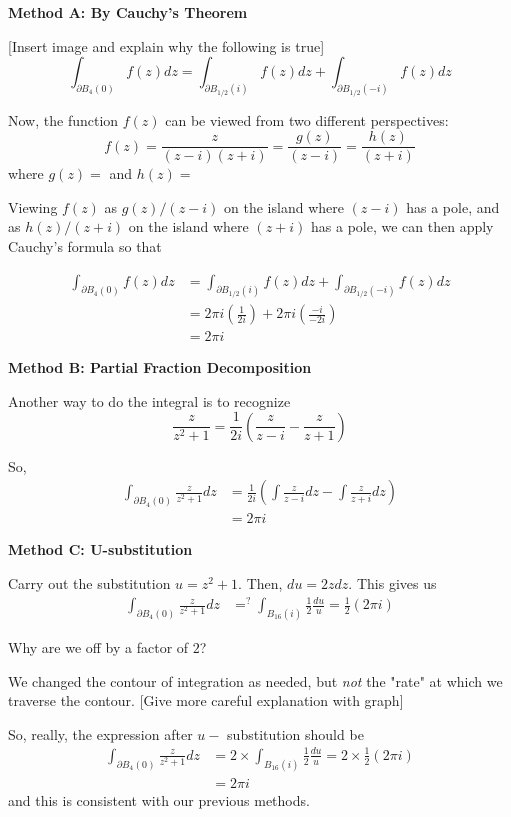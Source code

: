 \documentclass{article}
\begin{document}
\vskip 1cm
\textbf{Method A: By Cauchy's Theorem} 

[Insert image and explain why the following is true]
\[ \int_{\partial B_4(0)} f(z)dz  = \int_{\partial B_{1/2} (i)} f(z)dz + \int_{\partial B_{1/2} (-i)} f(z)dz  \]

Now, the function $f(z)$ can be viewed from two different perspectives:
\[ f(z) = \frac{z}{(z-i)(z+i)} = \frac{g(z)}{(z-i)} = \frac{h(z)}{(z+i)}\]
where $g(z) = $ and $h(z) = $

Viewing $f(z)$ as $g(z) / (z-i)$ on the island where $(z-i)$ has a pole, and as $h(z)/(z+i)$ on the island where $(z+i)$ has a pole, we can then apply Cauchy's formula so that 

\begin{align*}
  \int_{\partial B_4(0)} f(z)dz &= \int_{\partial B_{1/2} (i)} f(z)dz + \int_{\partial B_{1/2} (-i)} f(z)dz  \\
  &= 2\pi i \left( \frac{1}{2i} \right) + 2\pi i \left( \frac{-i}{-2i} \right) \\
  &= 2\pi i
\end{align*}

\vskip 0.5cm
\textbf{Method B: Partial Fraction Decomposition}

Another way to do the integral is to recognize 
\[ \frac{z}{z^2 + 1} = \frac{1}{2 i} \left( \frac{z}{z-i} - \frac{z}{z+1} \right)\]

So, 
\begin{align*}
  \int_{\partial B_4(0)} \frac{z}{z^2 + 1} dz &= \frac{1}{2i} \left( \int \frac{z}{z - i} dz - \int \frac{z}{z + i} dz \right) \\
  &= 2\pi i
\end{align*}


\vskip 0.5cm
\textbf{Method C: U-substitution}

Carry out the substitution $u = z^2 + 1$. Then, $du = 2z dz$. This gives us 
\begin{align*}
  \int_{\partial B_4(0)} \frac{z}{z^2 + 1} dz &=^{?} \int_{B_{16}(i)} \frac{1}{2} \frac{du}{u} = \frac{1}{2} (2\pi i)
\end{align*}

Why are we off by a factor of $2$? 
\begin{dottedbox}
  We changed the contour of integration as needed, but \emph{not} the "rate" at which we traverse the contour.
  [Give more careful explanation with graph]
\end{dottedbox}

So, really, the expression after $u-$ substitution should be 
\begin{align*}
  \int_{\partial B_4(0)} \frac{z}{z^2 + 1} dz &= 2 \times \int_{B_{16}(i)} \frac{1}{2} \frac{du}{u} = 2 \times \frac{1}{2} (2\pi i) \\
  &= 2\pi i
\end{align*}
and this is consistent with our previous methods.
\end{document}
